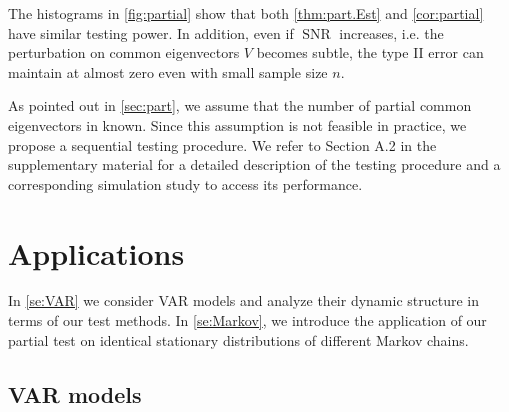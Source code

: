 \documentclass[12pt]{article}
\numberwithin{thm}{section}
\numberwithin{defn}{section}
\numberwithin{lem}{section}
\numberwithin{prop}{section}
\numberwithin{cor}{section}
\numberwithin{rem}{section}
\DeclareMathOperator{\SNR}{SNR}
\begin{document}
The histograms in \autoref{fig:partial} show that both \autoref{thm:part.Est} and \autoref{cor:partial} have similar testing power. In addition, even if $\SNR$ increases, i.e. the perturbation on common eigenvectors $V$ becomes subtle, the type II error can maintain at almost zero even with small sample size $n$.

As pointed out in \autoref{sec:part}, we assume that the number of partial common eigenvectors in known. Since this assumption is not feasible in practice, we propose a sequential testing procedure. We refer to {\color{cyan} Section A.2} in the supplementary material for a detailed description of the testing procedure and a corresponding simulation study to access its performance.

\vspace{-0.5cm}
\section{Applications} \label{sec:app}
\vspace{-0.3cm}
In \autoref{se:VAR} we consider VAR models and analyze their dynamic structure in terms of our test methods. 
In \autoref{se:Markov}, we introduce the application of our partial test on identical stationary distributions of different Markov chains.

\vspace{-0.5cm}
\subsection{VAR models} \label{se:VAR}
\vspace{-0.3cm}

\end{document}
